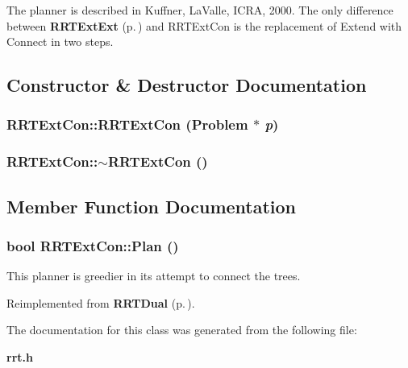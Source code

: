 The planner is described in Kuffner, La\-Valle, ICRA, 2000. The only difference between {\bf RRTExt\-Ext} {\rm (p.\,\pageref{class_RRTExtExt})} and RRTExt\-Con is the replacement of Extend with Connect in two steps. 



\subsection{Constructor \& Destructor Documentation}
\subsubsection{\setlength{\rightskip}{0pt plus 5cm}RRTExt\-Con::RRTExt\-Con ({\bf Problem} $\ast$ {\em p})}\label{class_RRTExtCon_a0}


\subsubsection{\setlength{\rightskip}{0pt plus 5cm}RRTExt\-Con::$\sim$RRTExt\-Con ()\hspace{0.3cm}{\tt  [inline, virtual]}}\label{class_RRTExtCon_a1}




\subsection{Member Function Documentation}
\subsubsection{\setlength{\rightskip}{0pt plus 5cm}bool RRTExt\-Con::Plan ()\hspace{0.3cm}{\tt  [virtual]}}\label{class_RRTExtCon_a2}


This planner is greedier in its attempt to connect the trees.



Reimplemented from {\bf RRTDual} {\rm (p.\,\pageref{class_RRTDual_a2})}.

The documentation for this class was generated from the following file:\begin{CompactItemize}
\item 
{\bf rrt.h}\end{CompactItemize}
